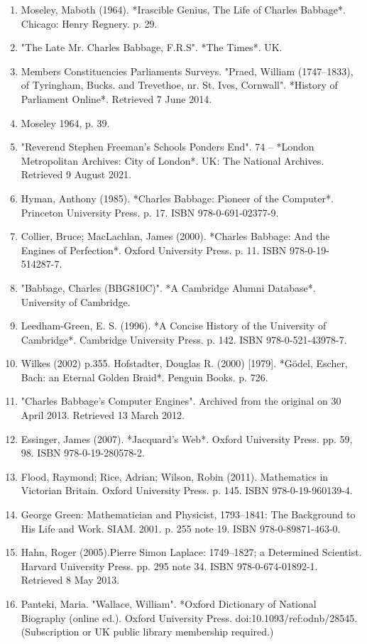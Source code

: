 \begin{enumerate}
\item Moseley, Maboth (1964). *Irascible Genius, The Life of Charles Babbage*. Chicago: Henry Regnery. p. 29.
\item "The Late Mr. Charles Babbage, F.R.S". *The Times*. UK.
\item Members Constituencies Parliaments Surveys. "Praed, William (1747–1833), of Tyringham, Bucks. and Trevethoe, nr. St. Ives, Cornwall". *History of Parliament Online*. Retrieved 7 June 2014.
\item Moseley 1964, p. 39.
\item "Reverend Stephen Freeman's Schools Ponders End". 74 – *London Metropolitan Archives: City of London*. UK: The National Archives. Retrieved 9 August 2021.
\item Hyman, Anthony (1985). *Charles Babbage: Pioneer of the Computer*. Princeton University Press. p. 17. ISBN 978-0-691-02377-9.
\item Collier, Bruce; MacLachlan, James (2000). *Charles Babbage: And the Engines of Perfection*. Oxford University Press. p. 11. ISBN 978-0-19-514287-7.
\item "Babbage, Charles (BBG810C)". *A Cambridge Alumni Database*. University of Cambridge.
\item Leedham-Green, E. S. (1996). *A Concise History of the University of Cambridge*. Cambridge University Press. p. 142. ISBN 978-0-521-43978-7.
\item Wilkes (2002) p.355.
Hofstadter, Douglas R. (2000) [1979]. *Gödel, Escher, Bach: an Eternal Golden Braid*. Penguin Books. p. 726.
\item "Charles Babbage's Computer Engines". Archived from the original on 30 April 2013. Retrieved 13 March 2012.
\item Essinger, James (2007). *Jacquard's Web*. Oxford University Press. pp. 59, 98. ISBN 978-0-19-280578-2.
\item Flood, Raymond; Rice, Adrian; Wilson, Robin (2011). Mathematics in Victorian Britain. Oxford University Press. p. 145. ISBN 978-0-19-960139-4.
\item George Green: Mathematician and Physicist, 1793–1841: The Background to His Life and Work. SIAM. 2001. p. 255 note 19. ISBN 978-0-89871-463-0.
\item Hahn, Roger (2005).Pierre Simon Laplace: 1749–1827; a Determined Scientist. Harvard University Press. pp. 295 note 34. ISBN 978-0-674-01892-1. Retrieved 8 May 2013.
\item Panteki, Maria. "Wallace, William". *Oxford Dictionary of National Biography (online ed.). Oxford University Press. doi:10.1093/ref:odnb/28545. (Subscription or UK public library membership required.)

\end{enumerate}
